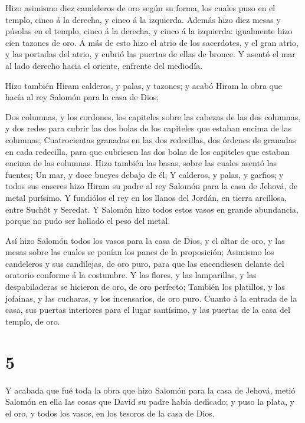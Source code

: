  Hizo asimismo diez candeleros de oro según su forma, los
cuales puso en el templo, cinco á la derecha, y cinco á la izquierda.
 Además hizo diez mesas y púsolas en el templo, cinco á la
derecha, y cinco á la izquierda: igualmente hizo cien tazones de oro.
 A más de esto hizo el atrio de los sacerdotes, y el gran
atrio, y las portadas del atrio, y cubrió las puertas de ellas de
bronce.  Y asentó el mar al lado derecho hacia el oriente,
enfrente del mediodía.

 Hizo también Hiram calderos, y palas, y tazones; y acabó
Hiram la obra que hacía al rey Salomón para la casa de Dios;

 Dos columnas, y los cordones, los capiteles sobre las
cabezas de las dos columnas, y dos redes para cubrir las dos bolas de
los capiteles que estaban encima de las columnas; 
Cuatrocientas granadas en las dos redecillas, dos órdenes de granadas en
cada redecilla, para que cubriesen las dos bolas de los capiteles que
estaban encima de las columnas.  Hizo también las basas,
sobre las cuales asentó las fuentes;  Un mar, y doce bueyes
debajo de él;  Y calderos, y palas, y garfios; y todos sus
enseres hizo Hiram su padre al rey Salomón para la casa de Jehová, de
metal purísimo.  Y fundiólos el rey en los llanos del
Jordán, en tierra arcillosa, entre Suchôt y Seredat.  Y
Salomón hizo todos estos vasos en grande abundancia, porque no pudo ser
hallado el peso del metal.

 Así hizo Salomón todos los vasos para la casa de Dios, y
el altar de oro, y las mesas sobre las cuales se ponían los panes de la
proposición;  Asimismo los candeleros y sus candilejas, de
oro puro, para que las encendiesen delante del oratorio conforme á la
costumbre.  Y las flores, y las lamparillas, y las
despabiladeras se hicieron de oro, de oro perfecto; 
También los platillos, y las jofainas, y las cucharas, y los
incensarios, de oro puro. Cuanto á la entrada de la casa, sus puertas
interiores para el lugar santísimo, y las puertas de la casa del templo,
de oro.

\hypertarget{section-4}{%
\section{5}\label{section-4}}

 Y acabada que fué toda la obra que hizo Salomón para la
casa de Jehová, metió Salomón en ella las cosas que David su padre había
dedicado; y puso la plata, y el oro, y todos los vasos, en los tesoros
de la casa de Dios.

